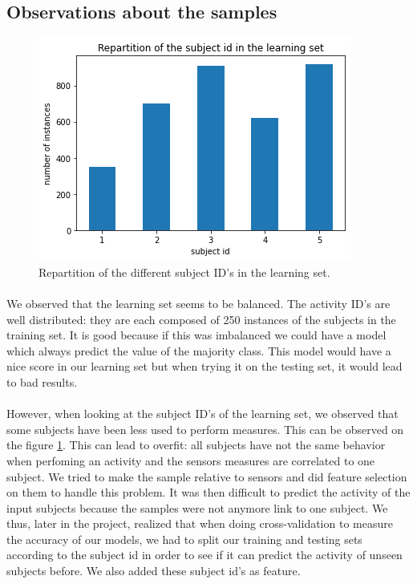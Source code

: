 \documentclass[a4paper, 11pt, oneside]{article}
\begin{document}
\subsection{Observations about the samples} \label{sec:obs}

\begin{figure}[H]
\center
\includegraphics[scale = 0.5]{preprocessing/subjects_repartition.png}
\caption{Repartition of the different subject ID's in the learning set.}
\label{subject_repartition}
\end{figure}

\paragraph{}We observed that the learning set seems to be balanced. The activity ID's are well distributed: they are each composed of 250 instances of the subjects in the training set. It is good because if this was imbalanced we could have a model which always predict the value of the majority class. This model would have a nice score in our learning set but when trying it on the testing set, it would lead to bad results. 

\paragraph{}However, when looking at the subject ID's of the learning set, we observed that some subjects have been less used to perform measures. This can be observed on the figure \ref{subject_repartition}.
This can lead to overfit: all subjects have not the same behavior when perfoming an activity and the sensors measures are correlated to one subject. We tried to make the sample relative to sensors and did feature selection on them to handle this problem. It was then difficult to predict the activity of the input subjects because the samples were not anymore link to one subject. We thus, later in the project, realized that when doing cross-validation to measure the accuracy of our models, we had to split our training and testing sets according to the subject id in order to see if it can predict the activity of unseen subjects before.
We also added these subject id's as feature.
\end{document}
